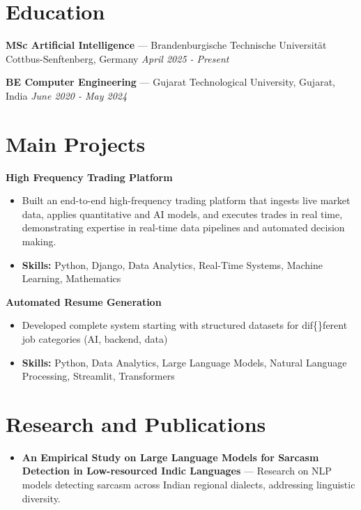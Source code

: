 \documentclass[a4paper,10pt]{article}
\begin{document}
\section*{Education}
\textbf{MSc Artificial Intelligence} — Brandenburgische Technische Universität Cottbus-Senftenberg, Germany \hfill \textit{April 2025 - Present}\par
\vspace{1.5pt}
\textbf{BE Computer Engineering} — Gujarat Technological University, Gujarat, India \hfill \textit{June 2020 - May 2024}\par

\section*{Main Projects}
\textbf{High Frequency Trading Platform}\par
\vspace{1pt}
\begin{itemize}
  \item Built an end-to-end high-frequency trading platform that ingests live market data, applies quantitative and AI models, and executes trades in real time, demonstrating expertise in real-time data pipelines and automated decision making.
  \item \textbf{Skills:} Python, Django, Data Analytics, Real-Time Systems, Machine Learning, Mathematics
\end{itemize}
\vspace{3pt}
\textbf{Automated Resume Generation}\par
\vspace{1pt}
\begin{itemize}
  \item Developed complete system starting with structured datasets for dif\{\}ferent job categories (AI, backend, data)
  \item \textbf{Skills:} Python, Data Analytics, Large Language Models, Natural Language Processing, Streamlit, Transformers
\end{itemize}

\section*{Research and Publications}
\begin{itemize}
\item \textbf{An Empirical Study on Large Language Models for Sarcasm Detection in Low-resourced Indic Languages} — Research on NLP models detecting sarcasm across Indian regional dialects, addressing linguistic diversity.
\end{itemize}
\end{document}
